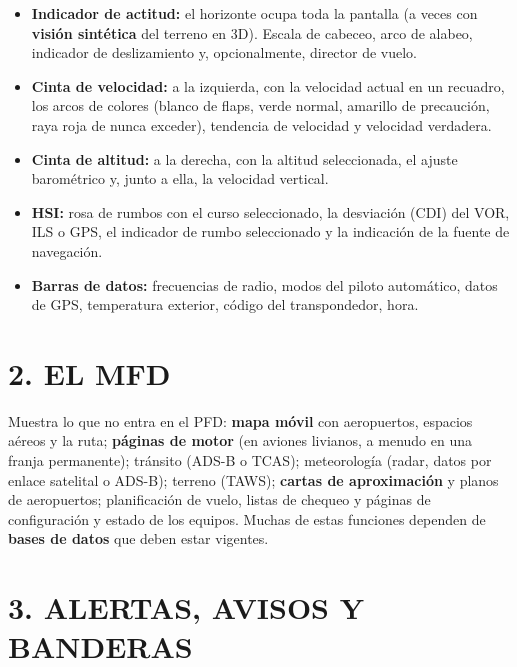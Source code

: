 \begin{itemize}
  \item \textbf{Indicador de actitud:} el horizonte ocupa toda la pantalla (a veces con
        \textbf{visión sintética} del terreno en 3D). Escala de cabeceo, arco de alabeo,
        indicador de deslizamiento y, opcionalmente, director de vuelo.
  \item \textbf{Cinta de velocidad:} a la izquierda, con la velocidad actual en un recuadro, los
        arcos de colores (blanco de flaps, verde normal, amarillo de precaución, raya roja de
        nunca exceder), tendencia de velocidad y velocidad verdadera.
  \item \textbf{Cinta de altitud:} a la derecha, con la altitud seleccionada, el ajuste
        barométrico y, junto a ella, la velocidad vertical.
  \item \textbf{HSI:} rosa de rumbos con el curso seleccionado, la desviación (CDI) del VOR, ILS o
        GPS, el indicador de rumbo seleccionado y la indicación de la fuente de navegación.
  \item \textbf{Barras de datos:} frecuencias de radio, modos del piloto automático, datos de GPS,
        temperatura exterior, código del transpondedor, hora.
\end{itemize}

\section*{2. EL MFD}

Muestra lo que no entra en el PFD: \textbf{mapa móvil} con aeropuertos, espacios aéreos y la ruta;
\textbf{páginas de motor} (en aviones livianos, a menudo en una franja permanente); tránsito
(ADS-B o TCAS); meteorología (radar, datos por enlace satelital o ADS-B); terreno (TAWS);
\textbf{cartas de aproximación} y planos de aeropuertos; planificación de vuelo, listas de chequeo y
páginas de configuración y estado de los equipos. Muchas de estas funciones dependen de
\textbf{bases de datos} que deben estar vigentes.

\section*{3. ALERTAS, AVISOS Y BANDERAS}

